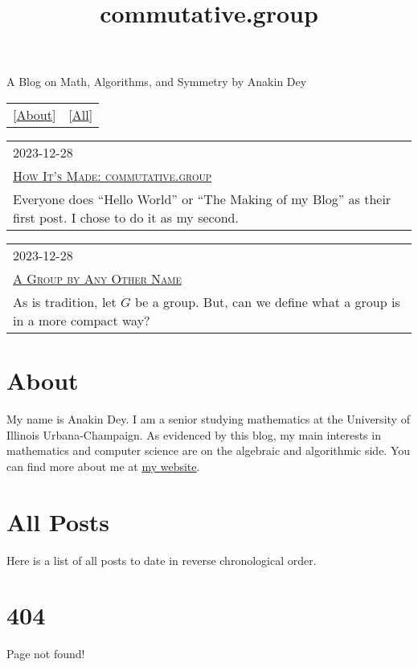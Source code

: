 \documentclass{article}
\title{commutative.group}
\begin{document}
\maketitle
\newline
\begin{center}
  A Blog on Math, Algorithms, and Symmetry by Anakin Dey
\end{center}
\begin{table}
  \centering
  \begin{tabular}{cc}
    \LARGE[\href{About.html}{About}] & \LARGE[\href{All-Posts.html}{All}]
  \end{tabular}
\end{table}

\begin{table}
  \centering
  \begin{tabular}{|l|}
    \hline
    \large 2023-12-28 \\
    \LARGE \href{posts/abel.html}{\textsc{How It's Made: commutative.group}} \\
    Everyone does ``Hello World'' or ``The Making of my Blog'' as their first post. I chose to do it as my second.
    \hline
  \end{tabular}
\end{table}

\begin{table}
  \centering
  \begin{tabular}{|l|}
    \hline
    \large 2023-12-28 \\
    \LARGE \href{posts/other_name.html}{\textsc{A Group by Any Other Name}} \\
    As is tradition, let $G$ be a group. But, can we define what a group is in a more compact way? \\
    \hline
  \end{tabular}
\end{table}

\part*{\centering About}

\newline

My name is Anakin Dey.
I am a senior studying mathematics at the University of Illinois Urbana-Champaign.
As evidenced by this blog, my main interests in mathematics and computer science are on the algebraic and algorithmic side.
You can find more about me at \href{https://www.anakin-dey.com/}{my website}.

\part*{\centering All Posts}

\newline

Here is a list of all posts to date in reverse chronological order.

\part*{404}

\newline

Page not found!
\end{document}
